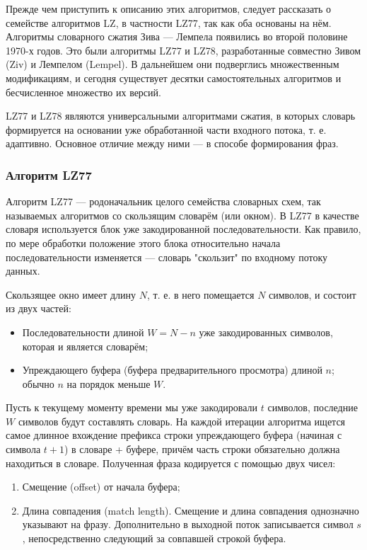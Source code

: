 \documentclass[12pt]{article}
\begin{document}
Прежде чем приступить к описанию этих алгоритмов, следует рассказать
о семействе алгоритмов LZ, в частности LZ77, так как оба основаны на нём.
Алгоритмы словарного сжатия Зива — Лемпела появились во второй половине 1970-х годов.
Это были алгоритмы LZ77 и LZ78, разработанные совместно
Зивом (Ziv) и Лемпелом (Lempel). В дальнейшем они подверглись множественным
модификациям, и сегодня существует десятки самостоятельных алгоритмов
и бесчисленное множество их версий.

LZ77 и LZ78 являются универсальными алгоритмами сжатия,
в которых словарь формируется на основании уже обработанной части входного потока,
т. е. адаптивно. Основное отличие между ними — в способе формирования фраз.

\subsubsection{Алгоритм LZ77}

Алгоритм LZ77 — родоначальник целого семейства словарных схем,
так называемых алгоритмов со скользящим словарём (или окном).
В LZ77 в качестве словаря используется блок уже закодированной последовательности.
Как правило, по мере обработки положение этого блока относительно начала
последовательности изменяется — словарь "скользит" по входному потоку данных.

Скользящее окно имеет длину $N$, т. е. в него помещается $N$ символов, и состоит из двух частей:

\begin{itemize}
    \item Последовательности длиной $W = N - n$ уже закодированных символов, которая и является словарём;
    \item Упреждающего буфера (буфера предварительного просмотра) длиной $n$; обычно $n$ на порядок меньше $W$.
\end{itemize}

Пусть к текущему моменту времени мы уже закодировали $t$ символов, последние $W$ символов будут
составлять словарь. На каждой итерации алгоритма ищется самое длинное вхождение префикса
строки упреждающего буфера (начиная с символа $t+1$) в словаре + буфере,
причём часть строки обязательно должна находиться в словаре. Полученная фраза
кодируется с помощью двух чисел:

\begin{enumerate}
    \item Смещение (offset) от начала буфера;
    \item Длина совпадения (match length).
          Смещение и длина совпадения однозначно указывают на фразу.
          Дополнительно в выходной поток записывается символ $s$,
          непосредственно следующий за совпавшей строкой буфера.
\end{enumerate}
\end{document}
